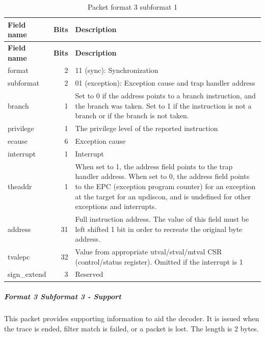 \documentclass[main\_\_EN.tex]{subfiles}
\begin{document}
\begin{longtable}[c]{ |l|r|L{10cm}| }
    \caption{Packet format 3 subformat 1}
    \label{tab:f3s1}
    \\\hline{}
    \textbf{Field name} & \textbf{Bits} & \textbf{Description} \\\hline
    \endfirsthead
    \textbf{Field name} & \textbf{Bits} & \textbf{Description} \\\hline
    \endhead
    \endfoot
    \endlastfoot

    format & 2 & 11 (sync): Synchronization \\\hline
    subformat & 2 & 01 (exception): Exception cause and trap handler address \\\hline
    branch & 1 & Set to 0 if the address points to a branch instruction, and the branch was taken. Set to 1 if the instruction is not a branch or if the branch is not taken. \\\hline
    privilege & 1 & The privilege level of the reported instruction \\\hline
    ecause & 6 & Exception cause \\\hline
    interrupt & 1 & Interrupt \\\hline
    theaddr & 1 & When set to 1, the address field points to the trap handler address. When set to 0, the address field points to the EPC (exception program counter) for an exception at the target for an updiscon, and is undefined for other exceptions and interrupts. \\\hline
    address & 31 & Full instruction address. The value of this field must be left shifted 1 bit in order to recreate the original byte address. \\\hline
    tvalepc & 32 & Value from appropriate utval/stval/mtval CSR (control/status register). Omitted if the interrupt is 1 \\\hline
    sign\_extend & 3 & Reserved \\\hline
 \end{longtable}



\subparagraph{Format 3 Subformat 3 - Support}

This packet provides supporting information to aid the decoder. It is issued when the trace is ended, filter match is failed, or a packet is lost. The length is 2 bytes.
\end{document}
